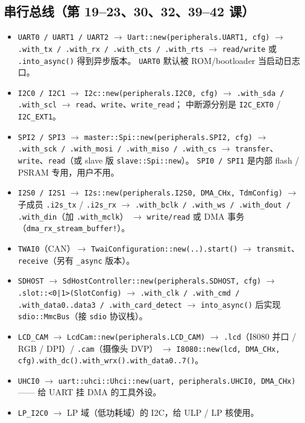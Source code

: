 \documentclass[UTF8,a4paper,11pt,fontset=fandol]{ctexart}
\newcommand{\fld}[1]{\texttt{#1}}
\begin{document}
\subsection{串行总线（第 19--23、30、32、39--42 课）}
\begin{itemize}
  \item \fld{UART0 / UART1 / UART2} $\rightarrow$ \fld{Uart::new(peripherals.UART1, cfg)}
    $\rightarrow$ \fld{.with\_tx / .with\_rx / .with\_cts / .with\_rts}
    $\rightarrow$ \fld{read/write} 或 \fld{.into\_async()} 得到异步版本。
    \fld{UART0} 默认被 ROM/bootloader 当启动日志口。
  \item \fld{I2C0 / I2C1} $\rightarrow$ \fld{I2c::new(peripherals.I2C0, cfg)}
    $\rightarrow$ \fld{.with\_sda / .with\_scl} $\rightarrow$ \fld{read}、\fld{write}、\fld{write\_read}；
    中断源分别是 \fld{I2C\_EXT0} / \fld{I2C\_EXT1}。
  \item \fld{SPI2 / SPI3} $\rightarrow$ \fld{master::Spi::new(peripherals.SPI2, cfg)}
    $\rightarrow$ \fld{.with\_sck / .with\_mosi / .with\_miso / .with\_cs}
    $\rightarrow$ \fld{transfer}、\fld{write}、\fld{read}（或 slave 版 \fld{slave::Spi::new}）。
    \fld{SPI0 / SPI1} 是内部 flash / PSRAM 专用，用户不用。
  \item \fld{I2S0 / I2S1} $\rightarrow$ \fld{I2s::new(peripherals.I2S0, DMA\_CHx, TdmConfig)}
    $\rightarrow$ 子成员 \fld{.i2s\_tx} / \fld{.i2s\_rx}
    $\rightarrow$ \fld{.with\_bclk / .with\_ws / .with\_dout / .with\_din}（加 \fld{.with\_mclk}）
    $\rightarrow$ \fld{write/read} 或 DMA 事务（\fld{dma\_rx\_stream\_buffer!}）。
  \item \fld{TWAI0}（CAN）$\rightarrow$ \fld{TwaiConfiguration::new(..).start()}
    $\rightarrow$ \fld{transmit}、\fld{receive}（另有 \fld{\_async} 版本）。
  \item \fld{SDHOST} $\rightarrow$ \fld{SdHostController::new(peripherals.SDHOST, cfg)}
    $\rightarrow$ \fld{.slot::<0|1>(SlotConfig)}
    $\rightarrow$ \fld{.with\_clk / .with\_cmd / .with\_data0..data3 / .with\_card\_detect}
    $\rightarrow$ \fld{into\_async()} 后实现 \fld{sdio::MmcBus}（接 \fld{sdio} 协议栈）。
  \item \fld{LCD\_CAM} $\rightarrow$ \fld{LcdCam::new(peripherals.LCD\_CAM)}
    $\rightarrow$ \fld{.lcd}（I8080 并口 / RGB / DPI）/ \fld{.cam}（摄像头 DVP）
    $\rightarrow$ \fld{I8080::new(lcd, DMA\_CHx, cfg).with\_dc().with\_wrx().with\_data0..7()}。
  \item \fld{UHCI0} $\rightarrow$ \fld{uart::uhci::Uhci::new(uart, peripherals.UHCI0, DMA\_CHx)}
    —— 给 UART 挂 DMA 的工具外设。
  \item \fld{LP\_I2C0} $\rightarrow$ LP 域（低功耗域）的 I2C，给 ULP / LP 核使用。
\end{itemize}
\end{document}
